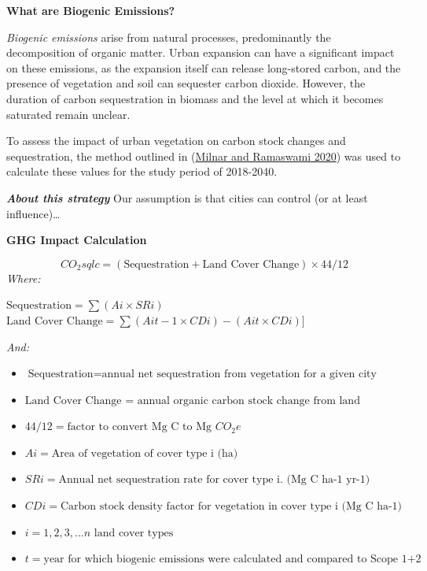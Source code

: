\documentclass[
]{book}
\providecommand{\tightlist}{%
  \setlength{\itemsep}{0pt}\setlength{\parskip}{0pt}}
\begin{document}
\textbf{What are Biogenic Emissions?}

\emph{Biogenic emissions} arise from natural processes, predominantly the decomposition of organic matter. Urban expansion can have a significant
impact on these emissions, as the expansion itself can release long-stored carbon, and the presence of vegetation and soil can sequester carbon dioxide. However, the duration of carbon sequestration in biomass and the level at which it becomes saturated remain unclear.

To assess the impact of urban vegetation on carbon stock changes and sequestration, the method outlined in (\protect\hyperlink{ref-Milnar_Ramaswami_2020}{Milnar and Ramaswami 2020}) was used
to calculate these values for the study period of 2018-2040.

\textbf{\emph{About this strategy}} Our assumption is that cities can control (or at least influence)\ldots{}

\textbf{GHG Impact Calculation}

\[CO_2sqlc = (\text{Sequestration} + \text{Land Cover Change}) × 44/12\]
\emph{Where:}

\(\text{Sequestration} = \sum{(Ai × SRi)}\)\\
\(\text{Land Cover Change} = \sum{(Ait-1 × CDi ) - (Ait × CDi )]}\)

\emph{And:}

\begin{itemize}
\tightlist
\item
  \(\text{Sequestration} = \text{annual net sequestration from vegetation for a given city}\)
\item
  \(\text{Land Cover Change = annual organic carbon stock change from land conversion for a given city, averaged over the study period}\)
\item
  \(44/12 = \text{factor to convert Mg C to Mg } CO_2e\)
\item
  \(Ai = \text{Area of vegetation of cover type i (ha)}\)
\item
  \(SRi = \text{Annual net sequestration rate for cover type i. (Mg C ha-1 yr-1)}\)
\item
  \(CDi = \text{Carbon stock density factor for vegetation in cover type i (Mg C ha-1)}\)
\item
  \(i = 1 ,2, 3, ...n\) \(\text{land cover types}\)
\item
  \(t = \text{year for which biogenic emissions were calculated and compared to Scope 1+2 emissions for each city}\)
\end{itemize}
\end{document}
